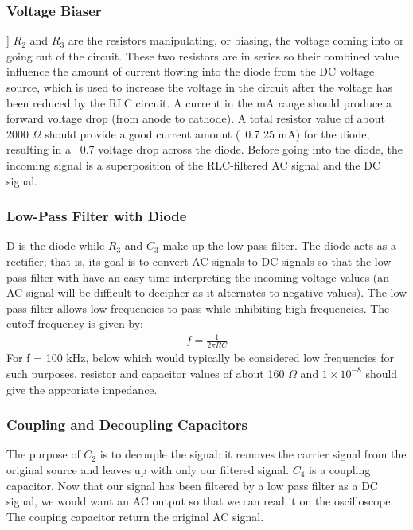 \documentclass[12pt]{article}
\begin{document}
\subsubsection{Voltage Biaser}]
$R_{2}$ and $R_{3}$ are the resistors manipulating, or biasing, the
voltage coming into or going out of the circuit. These two resistors are
in series so their combined value influence the amount of current
flowing into the diode from the DC voltage source, which is used to
increase the voltage in the circuit after the voltage has been reduced
by the RLC circuit. A current in the mA range should produce a forward
voltage drop (from anode to cathode). A total resistor value of about
2000 $\Omega$ should provide a good current amount (~0.7 25 mA) for the
diode, resulting in a ~0.7 voltage drop across the diode. Before going
into the diode, the incoming signal is a superposition of the
RLC-filtered AC signal and the DC signal.

\subsubsection{Low-Pass Filter with Diode}
D is the diode while $R_{3}$ and $C_{3}$ make up the low-pass
filter. The diode acts as a rectifier; that is, its goal is to convert
AC signals to DC signals so that the low pass filter with have an easy
time interpreting the incoming voltage values (an AC signal will be
difficult to decipher as it alternates to negative values). The low pass
filter allows low frequencies to pass while inhibiting high
frequencies. The cutoff frequency is given by:
\begin{align} f = \frac{1}{2\pi{RC}} \end{align}
For f = 100 kHz, below which would typically be considered low
frequencies for such purposes, resistor and capacitor values of about
160 $\Omega$ and $1\times{10^{-8}}$ should give the approriate
impedance. 

\subsubsection{Coupling and Decoupling Capacitors}
The purpose of $C_{2}$ is to decouple the signal: it removes the carrier
signal from the original source and leaves up with only our filtered
signal. $C_{4}$ is a coupling capacitor. Now that our signal has been
filtered by a low pass filter as a DC signal, we would want an AC output
so that we can read it on the oscilloscope. The couping capacitor return
the original AC signal.
\end{document}
